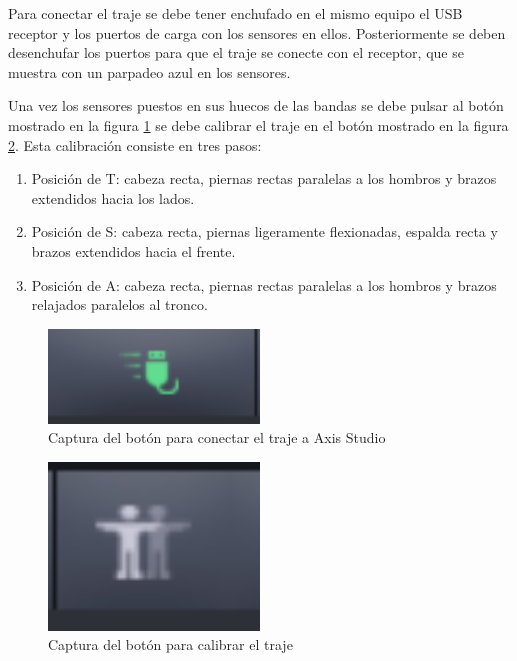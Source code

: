 Para conectar el traje se debe tener enchufado en el mismo equipo el USB receptor y los puertos de carga con los sensores en ellos.
Posteriormente se deben desenchufar los puertos para que el traje se conecte con el receptor, que se muestra con un parpadeo azul en los sensores.

Una vez los sensores puestos en sus huecos de las bandas se debe pulsar al botón mostrado en la figura \ref{fig:BotonConectar} se debe calibrar el traje en el botón mostrado en la figura \ref{fig:BotonCalibrar}.
Esta calibración consiste en tres pasos:
\begin{enumerate}
    \item Posición de T: cabeza recta, piernas rectas paralelas a los hombros y brazos extendidos hacia los lados.
    \item Posición de S: cabeza recta, piernas ligeramente flexionadas, espalda recta y brazos extendidos hacia el frente.
    \item Posición de A: cabeza recta, piernas rectas paralelas a los hombros y brazos relajados paralelos al tronco.
\end{enumerate}

\begin{figure}[H]
	\centering
	\includegraphics[width=0.5\textwidth]{Imagenes/Bitmap/ConectarTraje.PNG}
	\caption{Captura del botón para conectar el traje a Axis Studio}
	\label{fig:BotonConectar}
\end{figure}

\begin{figure}[H]
	\centering
	\includegraphics[width=0.5\textwidth]{Imagenes/Bitmap/Calibrar.PNG}
	\caption{Captura del botón para calibrar el traje}
	\label{fig:BotonCalibrar}
\end{figure}


